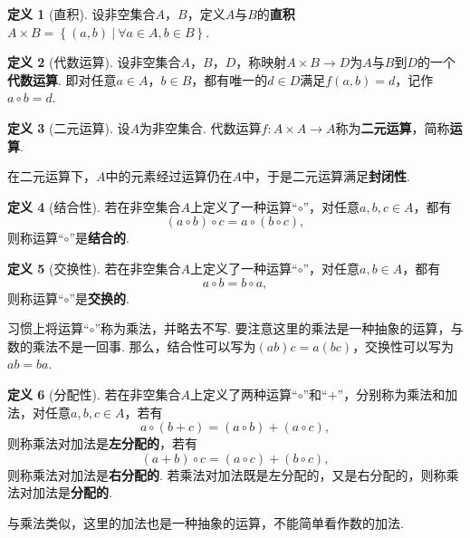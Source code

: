 \documentclass[12pt]{ctexart}
\theoremstyle{definition}
\newtheorem{definition}{定义}[section]
\theoremstyle{plain}
\begin{document}
\begin{definition}[直积]
	设非空集合$A$，$B$，定义$A$与$B$的\textbf{直积}$A\times B=\left\{(a,b)\ |\ \forall a\in A,b\in B\right\}$.
\end{definition}
\begin{definition}[代数运算]
	设非空集合$A$，$B$，$D$，称映射$A\times B\to D$为$A$与$B$到$D$的一个\textbf{代数运算}. 即对任意$a\in A$，$b\in B$，都有唯一的$d\in D$满足$f(a,b)=d$，记作$a\circ b=d$.
\end{definition}
\begin{definition}[二元运算]
	设$A$为非空集合. 代数运算$f:A\times A\to A$称为\textbf{二元运算}，简称\textbf{运算}.
\end{definition}
在二元运算下，$A$中的元素经过运算仍在$A$中，于是二元运算满足\textbf{封闭性}.
\begin{definition}[结合性]
	若在非空集合$A$上定义了一种运算“$\circ$”，对任意$a,b,c\in A$，都有
	$$(a\circ b)\circ c=a\circ(b\circ c),$$
	则称运算“$\circ$”是\textbf{结合的}.
\end{definition}
\begin{definition}[交换性]
	若在非空集合$A$上定义了一种运算“$\circ$”，对任意$a,b\in A$，都有
	$$a\circ b=b\circ a,$$
	则称运算“$\circ$”是\textbf{交换的}.
\end{definition}
习惯上将运算“$\circ$”称为乘法，并略去不写. 要注意这里的乘法是一种抽象的运算，与数的乘法不是一回事. 那么，结合性可以写为$(ab)c=a(bc)$，交换性可以写为$ab=ba$.
\begin{definition}[分配性]
	若在非空集合$A$上定义了两种运算“$\circ$”和“$+$”，分别称为乘法和加法，对任意$a,b,c\in A$，若有
	$$a\circ(b+c)=(a\circ b)+(a\circ c),$$
	则称乘法对加法是\textbf{左分配的}，若有
	$$(a+b)\circ c=(a\circ c)+(b\circ c),$$
	则称乘法对加法是\textbf{右分配的}. 若乘法对加法既是左分配的，又是右分配的，则称乘法对加法是\textbf{分配的}.
\end{definition}
与乘法类似，这里的加法也是一种抽象的运算，不能简单看作数的加法.
\end{document}
